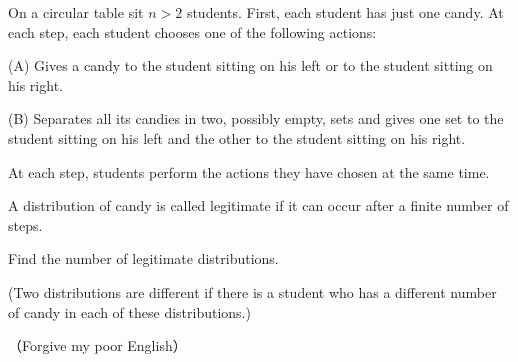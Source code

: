 On a circular table sit $\displaystyle {n> 2}$ students. First, each student has just one candy. At each step, each student chooses one of the following actions:

(A) Gives a candy to the student sitting on his left or to the student sitting on his right.

(B) Separates all its candies in two, possibly empty, sets and gives one set to the student sitting on his left and the other to the student sitting on his right.

At each step, students perform the actions they have chosen at the same time.

A distribution of candy is called legitimate if it can occur after a finite number of steps.

Find the number of legitimate distributions.

(Two distributions are different if there is a student who has a different number of candy in each of these distributions.)

（Forgive my poor English）
